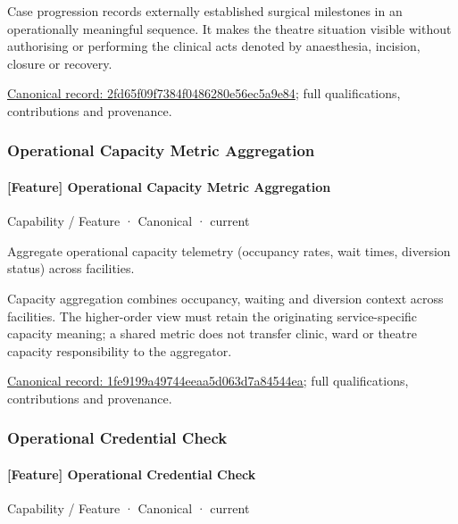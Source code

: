 Case progression records externally established surgical milestones in an operationally meaningful sequence. It makes the theatre situation visible without authorising or performing the clinical acts denoted by anaesthesia, incision, closure or recovery.


{\footnotesize \href{../../../../continuum/strategy/capability/feature/2fd65f09f7384f0486280e56ec5a9e84.md}{Canonical record: 2fd65f09f7384f0486280e56ec5a9e84}; full qualifications, contributions and provenance.}\par
\subsubsection{Operational Capacity Metric Aggregation}

\paragraph{[Feature] Operational Capacity Metric Aggregation}

\label{element:1fe9199a49744eeaa5d063d7a84544ea}
{\small Capability / Feature · Canonical · current}\par

Aggregate operational capacity telemetry (occupancy rates, wait times, diversion status) across facilities.



Capacity aggregation combines occupancy, waiting and diversion context across facilities. The higher-order view must retain the originating service-specific capacity meaning; a shared metric does not transfer clinic, ward or theatre capacity responsibility to the aggregator.


{\footnotesize \href{../../../../continuum/strategy/capability/feature/1fe9199a49744eeaa5d063d7a84544ea.md}{Canonical record: 1fe9199a49744eeaa5d063d7a84544ea}; full qualifications, contributions and provenance.}\par
\subsubsection{Operational Credential Check}

\paragraph{[Feature] Operational Credential Check}

\label{element:1a76831985fa461c891a3428e5dea86d}
{\small Capability / Feature · Canonical · current}\par


